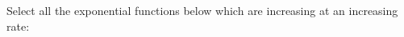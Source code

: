\documentclass{ximera}
\author{Ivo Terek}
\begin{document}
\begin{exercise}

  Select all the exponential functions below which are increasing at an increasing rate:
  \begin{selectAll}
  \end{selectAll}
\end{exercise}
\end{document}
